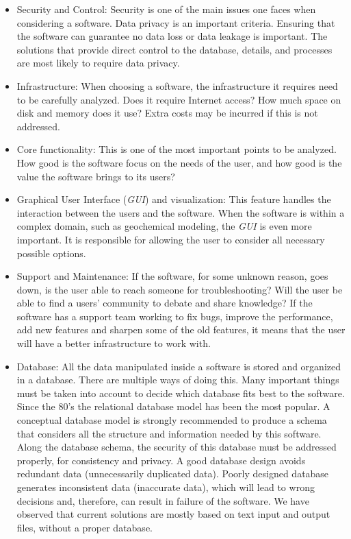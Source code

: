 \begin{enumerate}
\begin{itemize}
\item Security and Control: Security is one of the main issues one faces when considering a software. Data privacy is an important criteria. Ensuring that the software can guarantee no data loss or data leakage is important. The solutions that provide direct control to the database, details, and processes are most likely to require data privacy.

\item Infrastructure: When choosing a software, the infrastructure it requires need to be carefully analyzed. Does it require Internet access? How much space on disk and memory does it use? Extra costs may be incurred if this is not addressed.

\item Core functionality: This is one of the most important points to be analyzed. How good is the software focus on the needs of the user, and how good is the value the software brings to its users?

\item Graphical User Interface (\emph{GUI}) and visualization: This feature handles the interaction between the users and the software. When the software is within a complex domain, such as geochemical modeling, the \emph{GUI} is even more important. It is responsible for allowing the user to consider all necessary possible options. 

\item Support and Maintenance: If the software, for some unknown reason, goes down, is the user able to reach someone for troubleshooting? Will the user be able to find a users' community to debate and share knowledge? If the software has a support team working to fix bugs, improve the performance, add new features and sharpen some of the old features, it means that the user will have a better infrastructure to work with.

\item Database: All the data manipulated inside a software is stored and organized in a database. There are multiple ways of doing this. Many important things must be taken into account to decide which database fits best to the software. Since the 80's the relational database model has been the most popular. A conceptual database model is strongly recommended to produce a schema that considers all the structure and information needed by this software. Along the database schema, the security of this database must be addressed properly, for consistency and privacy. A good database design avoids redundant data (unnecessarily duplicated data). Poorly designed database generates inconsistent data (inaccurate data), which will lead to wrong decisions and, therefore, can result in failure of the software. We have observed that current solutions are mostly based on text input and output files, without a proper database. 
\end{itemize}



\end{enumerate}
